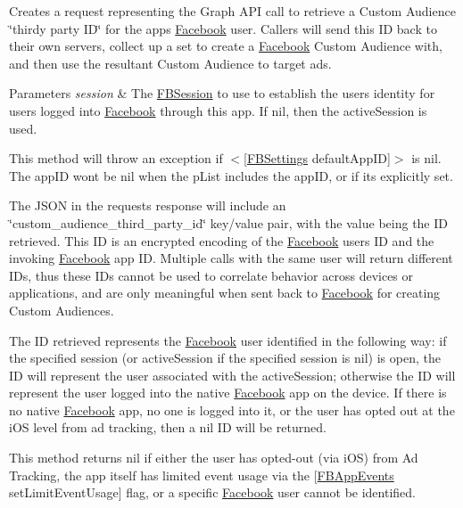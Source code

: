 Creates a request representing the Graph A\+PI call to retrieve a Custom Audience \char`\"{}thirdy party I\+D\char`\"{} for the app\textquotesingle{}s \hyperlink{interfaceFacebook}{Facebook} user. Callers will send this ID back to their own servers, collect up a set to create a \hyperlink{interfaceFacebook}{Facebook} Custom Audience with, and then use the resultant Custom Audience to target ads.


\begin{DoxyParams}{Parameters}
{\em session} & The \hyperlink{interfaceFBSession}{F\+B\+Session} to use to establish the user\textquotesingle{}s identity for users logged into \hyperlink{interfaceFacebook}{Facebook} through this app. If {\ttfamily nil}, then the active\+Session is used.\\
\hline
\end{DoxyParams}
This method will throw an exception if $<$\mbox{[}\hyperlink{interfaceFBSettings}{F\+B\+Settings} default\+App\+ID\mbox{]}$>$ is {\ttfamily nil}. The app\+ID won\textquotesingle{}t be nil when the p\+List includes the app\+ID, or if it\textquotesingle{}s explicitly set.

The J\+S\+ON in the request\textquotesingle{}s response will include an \char`\"{}custom\+\_\+audience\+\_\+third\+\_\+party\+\_\+id\char`\"{} key/value pair, with the value being the ID retrieved. This ID is an encrypted encoding of the \hyperlink{interfaceFacebook}{Facebook} user\textquotesingle{}s ID and the invoking \hyperlink{interfaceFacebook}{Facebook} app ID. Multiple calls with the same user will return different I\+Ds, thus these I\+Ds cannot be used to correlate behavior across devices or applications, and are only meaningful when sent back to \hyperlink{interfaceFacebook}{Facebook} for creating Custom Audiences.

The ID retrieved represents the \hyperlink{interfaceFacebook}{Facebook} user identified in the following way\+: if the specified session (or active\+Session if the specified session is {\ttfamily nil}) is open, the ID will represent the user associated with the active\+Session; otherwise the ID will represent the user logged into the native \hyperlink{interfaceFacebook}{Facebook} app on the device. If there is no native \hyperlink{interfaceFacebook}{Facebook} app, no one is logged into it, or the user has opted out at the i\+OS level from ad tracking, then a {\ttfamily nil} ID will be returned.

This method returns {\ttfamily nil} if either the user has opted-\/out (via i\+OS) from Ad Tracking, the app itself has limited event usage via the {\ttfamily \mbox{[}\hyperlink{interfaceFBAppEvents}{F\+B\+App\+Events} set\+Limit\+Event\+Usage\mbox{]}} flag, or a specific \hyperlink{interfaceFacebook}{Facebook} user cannot be identified. \mbox{\label{interfaceFBRequest_a17f11f5dad042b4109b3a001300d6916}} 
